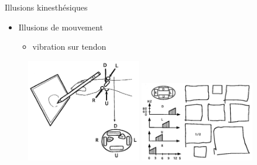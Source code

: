 {
\begin{frame}{Illusions kinesthésiques}
\begin{itemize}
\item Illusions de mouvement
\begin{itemize}
\item vibration sur tendon
\end{itemize}
\end{itemize}
\begin{figure}
\centering
\includegraphics[width=5cm]{images/vibrationmovement}
\includegraphics[width=5cm]{images/vibrationmovement2}
\end{figure}
\end{frame}
}


